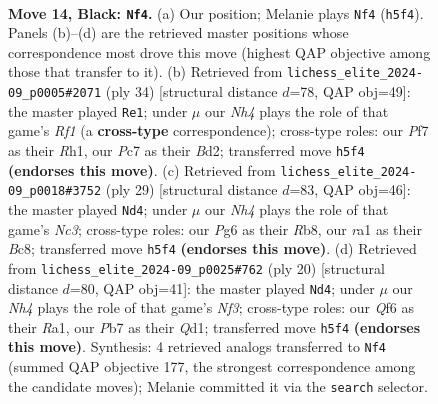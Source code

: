 \documentclass[11pt]{article}
\begin{document}
\clearpage

\begin{figure}[p]\centering
\begin{subfigure}{0.46\textwidth}\centering
\resizebox{\linewidth}{!}{%
\newchessgame
\chessboard[
  setfen={r1br2k1/ppp2p1p/3p1qp1/4b2n/N1P1P3/7P/PP1QBPP1/R1B2RK1 b - - 8 14},
  showmover=false,
  pgfstyle=straightmove, color=movearrow, markmove={h5-f4}
]}
\caption{}
\end{subfigure}\hfill
\begin{subfigure}{0.46\textwidth}\centering
\resizebox{\linewidth}{!}{%
\newchessgame
\chessboard[
  setfen={r4rk1/pp3pb1/2p2q1p/6pn/4P3/1BN2P1b/PPPB1Q1P/2K2R1R w - - 1 18},
  showmover=false,
  pgfstyle=straightmove, color=movearrow, markmove={f1-e1}
]}
\caption{}
\end{subfigure}
\\[4pt]
\begin{subfigure}{0.46\textwidth}\centering
\resizebox{\linewidth}{!}{%
\newchessgame
\chessboard[
  setfen={1rb1kb1r/p2p2pp/1qn1p3/2p1Pp2/2P2P2/P2B1Q2/1P3NPP/1RB1K2R b Kk - 4 15},
  showmover=false,
  pgfstyle=straightmove, color=movearrow, markmove={c6-d4}
]}
\caption{}
\end{subfigure}\hfill
\begin{subfigure}{0.46\textwidth}\centering
\resizebox{\linewidth}{!}{%
\newchessgame
\chessboard[
  setfen={r2qkb1r/ppp2ppp/2n3b1/8/4p1P1/1PB1PN1P/P2P1P2/R2QKB1R w KQkq - 1 11},
  showmover=false,
  pgfstyle=straightmove, color=movearrow, markmove={f3-d4}
]}
\caption{}
\end{subfigure}
\caption{\textbf{Move 14, Black: \texttt{Nf4}.} (a) Our position; Melanie plays \texttt{Nf4} (\texttt{h5f4}). Panels (b)--(d) are the retrieved master positions whose correspondence most drove this move (highest QAP objective among those that transfer to it). (b) Retrieved from \texttt{lichess\_elite\_2024-09\_p0005\#2071} (ply 34) [structural distance $d$=78, QAP obj=49]: the master played \texttt{Re1}; under $\mu$ our \emph{Nh4} plays the role of that game's \emph{Rf1} (a \textbf{cross-type} correspondence); cross-type roles: our \emph{P}f7 as their \emph{R}h1, our \emph{P}c7 as their \emph{B}d2; transferred move \texttt{h5f4} \textbf{(endorses this move)}. (c) Retrieved from \texttt{lichess\_elite\_2024-09\_p0018\#3752} (ply 29) [structural distance $d$=83, QAP obj=46]: the master played \texttt{Nd4}; under $\mu$ our \emph{Nh4} plays the role of that game's \emph{Nc3}; cross-type roles: our \emph{P}g6 as their \emph{R}b8, our \emph{r}a1 as their \emph{B}c8; transferred move \texttt{h5f4} \textbf{(endorses this move)}. (d) Retrieved from \texttt{lichess\_elite\_2024-09\_p0025\#762} (ply 20) [structural distance $d$=80, QAP obj=41]: the master played \texttt{Nd4}; under $\mu$ our \emph{Nh4} plays the role of that game's \emph{Nf3}; cross-type roles: our \emph{Q}f6 as their \emph{R}a1, our \emph{P}b7 as their \emph{Q}d1; transferred move \texttt{h5f4} \textbf{(endorses this move)}. Synthesis: 4 retrieved analogs transferred to \texttt{Nf4} (summed QAP objective 177, the strongest correspondence among the candidate moves); Melanie committed it via the \texttt{search} selector.}
\label{fig:thought-m27}
\end{figure}
\end{document}
